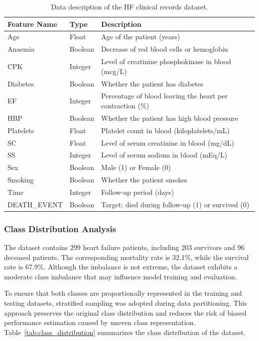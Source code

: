 \documentclass[12pt,a4paper]{article}
\begin{document}
\begin{table}[H]
\centering
\caption{Data description of the HF clinical records dataset.}
\label{tab:data_description}
\small
\begin{tabular}{lll}
\toprule
\textbf{Feature Name} & \textbf{Type} & \textbf{Description} \\
\midrule
Age              & Float   & Age of the patient (years) \\
Anaemia          & Boolean & Decrease of red blood cells or hemoglobin \\
CPK              & Integer & Level of creatinine phosphokinase in blood (mcg/L) \\
Diabetes         & Boolean & Whether the patient has diabetes \\
EF               & Integer & Percentage of blood leaving the heart per contraction (\%) \\
HBP              & Boolean & Whether the patient has high blood pressure \\
Platelets        & Float   & Platelet count in blood (kiloplatelets/mL) \\
SC               & Float   & Level of serum creatinine in blood (mg/dL) \\
SS               & Integer & Level of serum sodium in blood (mEq/L) \\
Sex              & Boolean & Male (1) or Female (0) \\
Smoking          & Boolean & Whether the patient smokes \\
Time             & Integer & Follow-up period (days) \\
DEATH\_EVENT     & Boolean & Target: died during follow-up (1) or survived (0) \\
\bottomrule
\end{tabular}
\end{table}

\subsubsection{Class Distribution Analysis}

The dataset contains 299 heart failure patients, including 203 survivors and 96 deceased patients. The corresponding mortality rate is 32.1\%, while the survival rate is 67.9\%. Although the imbalance is not extreme, the dataset exhibits a moderate class imbalance that may influence model training and evaluation.

To ensure that both classes are proportionally represented in the training and testing datasets, stratified sampling was adopted during data partitioning. This approach preserves the original class distribution and reduces the risk of biased performance estimation caused by uneven class representation. Table~\ref{tab:class_distribution} summarizes the class distribution of the dataset.
\end{document}
